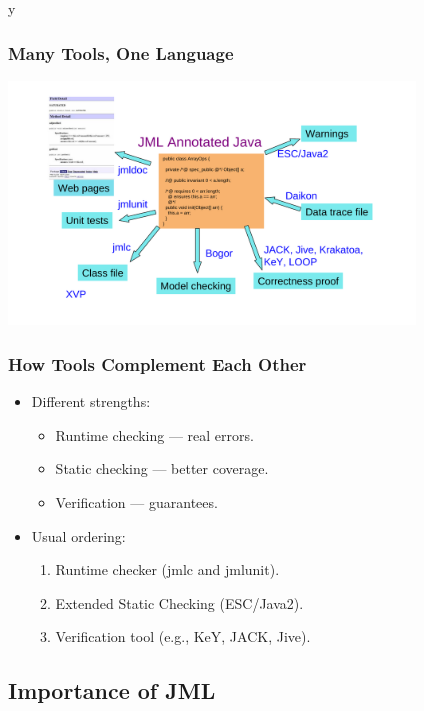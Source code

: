 \if y\MAKEHANDOUTS \documentclass[t,compress,landscape,handout]{beamer}
\begin{document}
\begin{frame}
\frametitle{Many Tools, One Language}
\includegraphics[width=4.25in]{tools-overview}
\end{frame}

\begin{frame}
\frametitle{How Tools Complement Each Other}
\begin{itemize}
\item
Different strengths:
\begin{itemize}
\item
Runtime checking --- real errors.

\item
Static checking --- better coverage.

\item
Verification --- guarantees.
\end{itemize}

\item
Usual ordering:
\begin{enumerate}
\item
Runtime checker (jmlc and jmlunit).

\item
Extended Static Checking (ESC/Java2).

\item
Verification tool (e.g., KeY, JACK, Jive).
\end{enumerate}
\end{itemize}
\end{frame}

\subsection[Importance]{Importance of JML}
\end{document}
